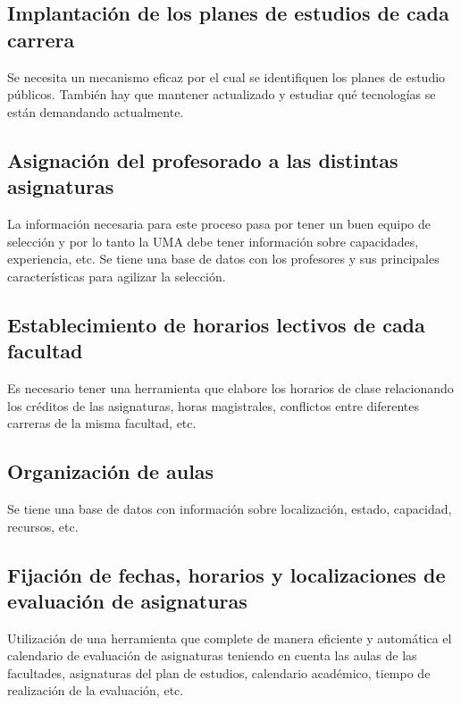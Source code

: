 \documentclass[11pt,a4paper,spanish,twoside]{book}
\begin{document}
\subsection{Implantación de los planes de estudios de cada carrera}
Se necesita un mecanismo eficaz por el cual se identifiquen los planes de
estudio públicos. También hay que mantener actualizado y estudiar qué
tecnologías se están demandando actualmente.  

\subsection{Asignación del profesorado a las distintas asignaturas}
La información necesaria para este proceso pasa por tener un buen equipo de
selección y por lo tanto la UMA debe tener información sobre capacidades,
experiencia, etc.
Se tiene una base de datos con los profesores y sus principales
características para agilizar la selección. 

\subsection{Establecimiento de horarios lectivos de cada facultad}
Es necesario tener una herramienta que elabore los horarios de clase
relacionando los créditos de las asignaturas, horas magistrales, conflictos
entre diferentes carreras de la misma facultad, etc.

\subsection{Organización de aulas}
Se tiene una base de datos con información sobre localización, estado,
capacidad, recursos, etc. 

\subsection{Fijación de  fechas, horarios y localizaciones de evaluación de
  asignaturas}
Utilización de una herramienta que complete de manera eficiente y automática
el calendario de evaluación de asignaturas teniendo en cuenta las aulas de
las facultades, asignaturas del plan de estudios, calendario académico,
tiempo de realización de la evaluación, etc.
\end{document}
